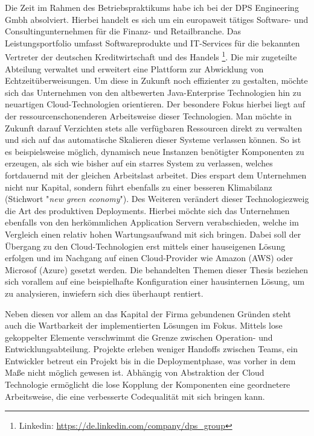 Die Zeit im Rahmen des Betriebspraktikums habe ich bei der DPS Engineering Gmbh absolviert. Hierbei handelt es sich um ein europaweit tätiges Software- und Consultingunternehmen für die Finanz- und Retailbranche. Das Leistungsportfolio umfasst Softwareprodukte und IT-Services für die bekannten Vertreter der deutschen Kreditwirtschaft und des Handels \footnote{Linkedin: \url{https://de.linkedin.com/company/dps_group}}. Die mir zugeteilte Abteilung verwaltet und erweitert eine Plattform zur Abwicklung von Echtzeitüberweisungen. Um diese in Zukunft noch effizienter zu gestalten, möchte sich das Unternehmen von den altbewerten Java-Enterprise Technologien hin zu neuartigen Cloud-Technologien orientieren. Der besondere Fokus hierbei liegt auf der ressourcenschonenderen Arbeitsweise dieser Technologien. Man möchte in Zukunft darauf Verzichten stets alle verfügbaren Ressourcen direkt zu verwalten und sich auf das automatische Skalieren dieser Systeme verlassen können. So ist es beispielsweise möglich, dynamisch neue Instanzen benötigter Komponenten zu erzeugen, als sich wie bisher auf ein starres System zu verlassen, welches fortdauernd mit der gleichen Arbeitslast arbeitet. Dies erspart dem Unternehmen nicht nur Kapital, sondern führt ebenfalls zu einer besseren Klimabilanz (Stichwort "\emph{new green economy}"). Des Weiteren verändert dieser Technologiezweig die Art des produktiven Deployments. Hierbei möchte sich das Unternehmen ebenfalls von den herkömmlichen Application Servern verabschieden, welche im Vergleich einen relativ hohen Wartungsaufwand mit sich bringen. Dabei soll der Übergang zu den Cloud-Technologien erst mittels einer hauseigenen Lösung erfolgen und im Nachgang auf einen Cloud-Provider wie Amazon (AWS) oder Microsof (Azure) gesetzt werden. Die behandelten Themen dieser Thesis beziehen sich vorallem auf eine beispielhafte Konfiguration einer hausinternen Lösung, um zu analysieren, inwiefern sich dies überhaupt rentiert. 

Neben diesen vor allem an das Kapital der Firma gebundenen Gründen steht auch die Wartbarkeit der implementierten Lösungen im Fokus. Mittels lose gekoppelter Elemente verschwimmt die Grenze zwischen Operation- und Entwicklungsabteilung. Projekte erleben weniger Handoffs zwischen Teams, ein Entwickler betreut ein Projekt bis in die Deploymentphase, was vorher in dem Maße nicht möglich gewesen ist. Abhängig von Abstraktion der Cloud Technologie ermöglicht die lose Kopplung der Komponenten eine geordnetere Arbeitsweise, die eine verbesserte Codequalität mit sich bringen kann. 

